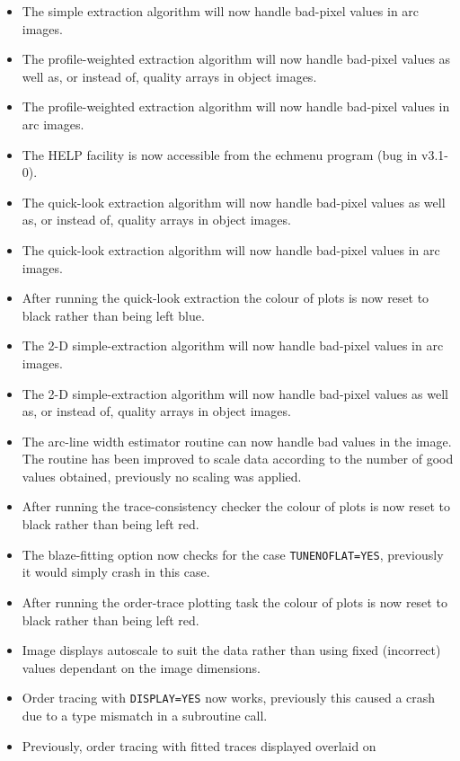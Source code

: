 \documentclass[twoside,11pt]{article}
\newcommand{\htmlref}[2]{#1}
\renewcommand{\_}{\texttt{\symbol{95}}}
\begin{document}
\begin{itemize}
\item The simple extraction algorithm will now handle bad-pixel values in
   arc images.
\item The profile-weighted extraction algorithm will now handle bad-pixel
   values as well as, or instead of, quality arrays in object images.
\item The profile-weighted extraction algorithm will now handle bad-pixel
   values in arc images.
\item The HELP facility is now accessible from the echmenu program (bug in
   v3.1-0).
\item The quick-look extraction algorithm will now handle bad-pixel
   values as well as, or instead of, quality arrays in object images.
\item The quick-look extraction algorithm will now handle bad-pixel
   values in arc images.
\item After running the quick-look extraction the colour of plots is now
   reset to black rather than being left blue.
\item The 2-D simple-extraction algorithm will now handle bad-pixel values
   in arc images.
\item The 2-D simple-extraction algorithm will now handle bad-pixel values
   as well as, or instead of, quality arrays in object images.
\item The arc-line width estimator routine can now handle bad values in the
   image.  The routine has been improved to scale data according to the
   number of good values obtained, previously no scaling was applied.
\item After running the trace-consistency checker the colour of plots is
   now reset to black rather than being left red.
\item The blaze-fitting option now checks for the case
   \htmlref{{\tt{TUNE\_NOFLAT=YES}}}{par_TUNE_NOFLAT},
   previously it would simply crash in this case.
\item After running the order-trace plotting task the colour of plots is
   now reset to black rather than being left red.
\item Image displays autoscale to suit the data rather than using fixed
   (incorrect) values dependant on the image dimensions.
\item Order tracing with \htmlref{{\tt{DISPLAY=YES}}}{par_DISPLAY} now works,
   previously this caused
   a crash due to a type mismatch in a subroutine call.
\item Previously, order tracing with fitted traces displayed overlaid on

\end{itemize}
\end{document}
